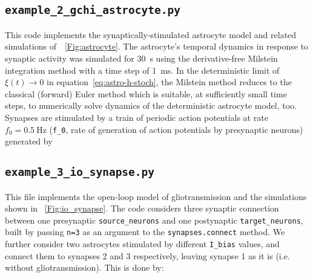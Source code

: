 \documentclass[a4paper, 11pt]{article}
\newcommand*{\figref}[1]{\figurename~\ref{#1}}
\renewcommand*{\eqref}[1]{equation~\ref{#1}}
\begin{document}
\begin{appendices}
\subsection*{\lstinline|example_2_gchi_astrocyte.py|}
This code implements the synaptically-stimulated astrocyte model and related simulations of~\figref{Fig:astrocyte}.
The astrocyte's temporal dynamics in response to synaptic activity was simulated for \SI{30}{s} using the derivative-free Milstein integration method with a time step of \SI{1}{\milli s}.
In the deterministic limit of $\xi(t)\rightarrow 0$ in \eqref{eq:astro-h-stoch}, the Milstein method reduces to the classical (forward) Euler method which is suitable, at sufficiently small time steps, to numerically solve dynamics of the deterministic astrocyte model, too.
Synapses are stimulated by a train of periodic action potentials at rate $f_0 = \SI{0.5}{\hertz}$ (\lstinline|f_0|, rate of generation of action potentials by presynaptic neurons) generated by


\subsection*{\lstinline|example_3_io_synapse.py|}
This file implements the open-loop model of gliotransmission and the simulations shown in \figref{Fig:io_synapse}.
The code considers three synaptic connection between one presynaptic \lstinline|source_neurons| and one postynaptic \lstinline|target_neurons|, built by passing \lstinline|n=3| as an argument to the \lstinline|synapses.connect| method.
We further consider two astrocytes stimulated by different \lstinline|I_bias| values, and connect them to synapses 2 and 3 respectively, leaving synapse 1 as it is (i.e. without gliotransmission).
This is done by:



\end{appendices}
\end{document}
